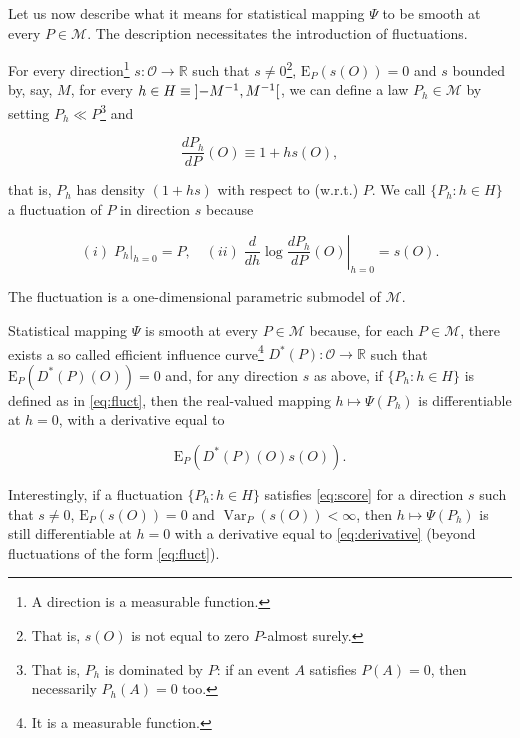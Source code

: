 \documentclass[]{article}
\let\rmarkdownfootnote\footnote%
\def\footnote{\protect\rmarkdownfootnote}
\DeclareMathOperator{\Var}{Var}
\newcommand{\bbR}{\mathbb{R}}
\newcommand{\calM}{\mathcal{M}}
\newcommand{\calO}{\mathcal{O}}
\newcommand{\Exp}{\textrm{E}}
\theoremstyle{definition}
\theoremstyle{definition}
\theoremstyle{definition}
\theoremstyle{remark}
\begin{document}
Let us now describe what it means for statistical mapping \(\Psi\) to be
smooth at every \(P \in \calM\). The description necessitates the
introduction of fluctuations.

For every direction\footnote{A direction is a measurable function.}
\(s : \calO \to \bbR\) such that
\(s \neq 0\)\footnote{That is, $s(O)$ is  not equal to zero
$P$-almost surely.}, \(\Exp_{P} (s(O)) = 0\) and \(s\) bounded by, say,
\(M\), for every \(h \in H \equiv \interval[open]{-M^{-1}}{M^{-1}}\), we
can define a law \(P_{h} \in \calM\) by setting
\(P_{h} \ll P\)\footnote{That  is, $P_{h}$  is
dominated  by $P$:  if an  event $A$  satisfies $P(A)  = 0$,  then necessarily
$P_{h} (A) = 0$ too.} and

\begin{equation}\label{eq:fluct}\frac{dP_{h}}{dP}(O)    \equiv     1    +    h
s(O),\end{equation}

that is, \(P_{h}\) has density \((1 + h s)\) with respect to (w.r.t.)
\(P\). We call \(\{P_{h} : h \in H\}\) a fluctuation of \(P\) in
direction \(s\) because

\begin{equation}\label{eq:score}(i)  \;  P_{h}|_{h=0}  =   P,  \quad  (ii)  \;
\left.\frac{d}{dh}       \log        \frac{dP_{h}}{dP}(O)\right|_{h=0}       =
s(O).\end{equation}

The fluctuation is a one-dimensional parametric submodel of \(\calM\).

Statistical mapping \(\Psi\) is smooth at every \(P \in \calM\) because,
for each \(P \in \calM\), there exists a so called efficient influence
curve\footnote{It
is  a   measurable  function.} \(D^{*}(P) : \calO \to \bbR\) such that
\(\Exp_{P}(D^{*}(P)(O)) = 0\) and, for any direction \(s\) as above, if
\(\{P_{h} : h \in H\}\) is defined as in \eqref{eq:fluct}, then the
real-valued mapping \(h \mapsto \Psi(P_{h})\) is differentiable at
\(h=0\), with a derivative equal to

\begin{equation}\label{eq:derivative}\Exp_{P}                \left(D^{*}(P)(O)
s(O)\right).\end{equation}

Interestingly, if a fluctuation \(\{P_{h} : h \in H\}\) satisfies
\eqref{eq:score} for a direction \(s\) such that \(s\neq 0\),
\(\Exp_{P}(s(O)) = 0\) and \(\Var_{P} (s(O)) < \infty\), then
\(h \mapsto \Psi(P_{h})\) is still differentiable at \(h=0\) with a
derivative equal to \eqref{eq:derivative} (beyond fluctuations of the
form \eqref{eq:fluct}).
\end{document}
